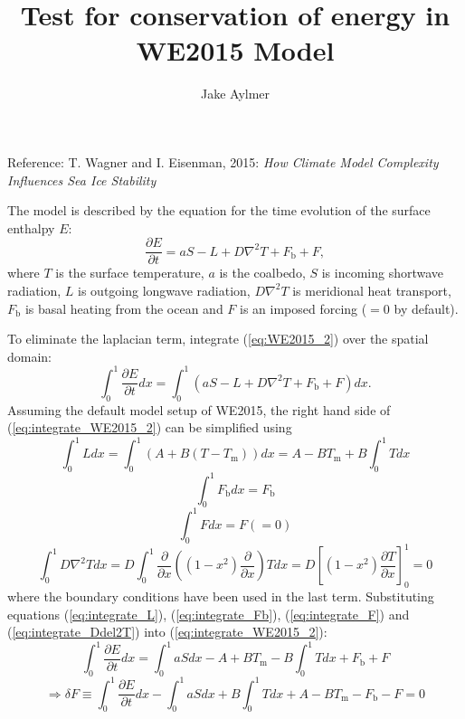 \documentclass[12pt]{article}
\begin{document}
\thispagestyle{empty}

\title{Test for conservation of energy in WE2015 Model}
\author{Jake Aylmer}
\maketitle
\large
\begin{center}
Reference: T. Wagner and I. Eisenman, 2015: \textit{How Climate Model Complexity Influences Sea Ice Stability}
\end{center}
\normalsize
	
The model is described by the equation for the time evolution of the surface enthalpy $E$:
\begin{equation}\label{eq:WE2015_2}
\frac{\partial E}{\partial t} = aS - L + D\nabla^2T + F_\mathrm{b} + F,
\end{equation}
where $T$ is the surface temperature, $a$ is the coalbedo, $S$ is incoming shortwave radiation, $L$ is outgoing longwave radiation, $D\nabla^2T$ is meridional heat transport, $F_\mathrm{b}$ is basal heating from the ocean and $F$ is an imposed forcing ($=0$ by default).

To eliminate the laplacian term, integrate (\ref{eq:WE2015_2}) over the spatial domain:
\begin{equation}\label{eq:integrate_WE2015_2}
\int_0^1\frac{\partial E}{\partial t}dx = \int_0^1\left(aS - L + D\nabla^2T + F_\mathrm{b} + F\right)dx.
\end{equation}
Assuming the default model setup of WE2015, the right hand side of (\ref{eq:integrate_WE2015_2}) can be simplified using
\begin{equation}\label{eq:integrate_L}
\int_0^1Ldx = \int_0^1\left(A+B\left(T-T_\mathrm{m}\right)\right)dx = A - BT_\mathrm{m} + B\int_0^1 Tdx
\end{equation}
\begin{equation}\label{eq:integrate_Fb}
\int_0^1F_\mathrm{b}dx = F_\mathrm{b}
\end{equation}
\begin{equation}\label{eq:integrate_F}
\int_0^1Fdx = F (=0)
\end{equation}
\begin{equation}\label{eq:integrate_Ddel2T}
\int_0^1D\nabla^2Tdx = D\int_0^1\frac{\partial}{\partial x}\left((1-x^2)\frac{\partial}{\partial x}\right)Tdx = D\left[(1-x^2)\frac{\partial T}{\partial x}\right]_0^1 = 0
\end{equation}
where the boundary conditions have been used in the last term. Substituting equations (\ref{eq:integrate_L}), (\ref{eq:integrate_Fb}), (\ref{eq:integrate_F}) and (\ref{eq:integrate_Ddel2T}) into (\ref{eq:integrate_WE2015_2}):
\begin{equation}
\int_0^1\frac{\partial E}{\partial t}dx = \int_0^1aSdx - A + BT_\mathrm{m} - B\int_0^1Tdx + F_\mathrm{b} + F
\end{equation}
\begin{equation}\label{eq:diagnostic}
\Rightarrow \delta F \equiv \int_0^1\frac{\partial E}{\partial t}dx - \int_0^1aSdx + B\int_0^1Tdx + A - BT_\mathrm{m} - F_\mathrm{b} - F = 0
\end{equation}
\end{document}
